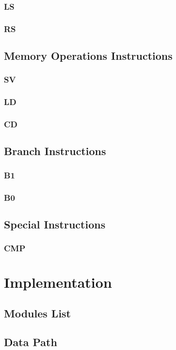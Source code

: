 \documentclass[11pt]{report}
\begin{document}
    \subsection{LS}
    \subsection{RS}

    \section{Memory Operations Instructions}
    \subsection{SV}
    \subsection{LD}
    \subsection{CD}

    \section{Branch Instructions}
    \subsection{B1}
    \subsection{B0}

    \section{Special Instructions}
    \subsection{CMP}



    \chapter{Implementation}
    \label{chapter:implementation}
    \section{Modules List}
    \section{Data Path}
\end{document}
